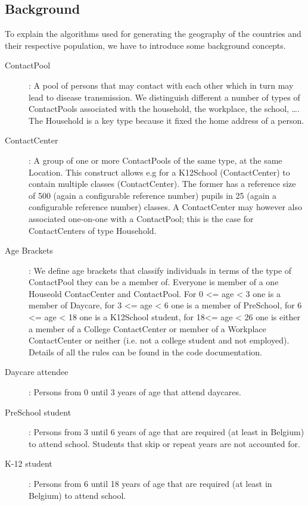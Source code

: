 \subsection{Background}
\label{subsection:background}

To explain the algorithms used for generating the geography of the countries and their respective population, we have to introduce some background concepts. 

\begin{description}
    \item[ContactPool]:
        A pool of persons that may contact with each other which in turn may lead to disease transmission.
        We distinguish different a number of types of ContactPools associated with the household, the workplace, 
        the school, \ldots. The Household is a key type because it fixed the home address of a person.
    \item[ContactCenter]:
        A group of one or more ContactPools of the same type, at the same Location.
        This construct allows e.g for a K12School (ContactCenter) to contain multiple classes (ContactCenter). 
        The former has a reference size of 500 (again a configurable reference number) pupils in 25 
        (again a configurable reference number) classes.
        A ContactCenter may however also associated one-on-one with a ContactPool; this is the case for 
        ContactCenters of type  Household.
\item[Age Brackets]: 
    		We define age brackets that classify individuals in terms of the type of ContactPool they 
    		can be a member of. Everyone is member of a one Houseold ContacCenter and ContactPool. 
    		For 0 <= age < 3 one is a member of Daycare, for 3 <= age < 6 one is a member of PreSchool, for 6 <= age < 18 one
    		is a K12School student, for 18<= age < 26 one is either a member of a College
    		ContactCenter or member of a Workplace ContactCenter or neither (i.e. not a college student and not
    		employed). Details of all the rules can be found in the code documentation.
    \item[Daycare attendee]:
    		Persons from 0 until 3 years of age that attend daycares.
    \item[PreSchool student]:
    		Persons from 3 until 6 years of age that are required (at least in Belgium) to attend school. 
    		Students that skip or repeat years are not accounted for.
    \item[K-12 student]: 
    		Persons from 6 until 18 years of age that are required (at least in Belgium) to attend school. 

\end{description}
